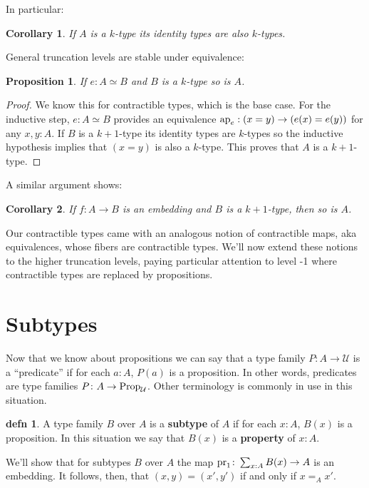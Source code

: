 \documentclass{amsart}
\theoremstyle{theorem}
\newtheorem*{cor}{Corollary}
\newtheorem*{prop}{Proposition}
\theoremstyle{definition}
\newtheorem*{defn}{defn}
\theoremstyle{remark}
\newcommand{\0}{\mathbbe{0}}
\newcommand{\1}{\mathbbe{1}}
\newcommand{\2}{\mathbbe{2}}
\newcommand{\3}{\mathbbe{3}}
\newcommand{\4}{\mathbbe{4}}
\newcommand{\term}[1]{{\textup{#1}}}
\newcommand{\type}[1]{{\textup{#1}}}
\newcommand{\pr}{\term{pr}}
\newcommand{\ap}{\term{ap}}
\newcommand{\UU}{{\mathcal{U}}}
\newcommand{\Prop}{\type{Prop}_{\UU}}
\begin{document}
In particular:

\begin{cor} If $A$ is a $k$-type its identity types are also $k$-types.
\end{cor}

General truncation levels are stable under equivalence:

\begin{prop} If $e : A \simeq B$ and $B$ is a $k$-type so is $A$.
\end{prop}
\begin{proof}
We know this for contractible types, which is the base case. For the inductive step, $e: A \simeq B$ provides an equivalence $\ap_e :(x=y) \to (e(x)=e(y))$ for any $x,y:A$. If $B$ is a $k+1$-type its identity types are $k$-types so the inductive hypothesis implies that $(x=y)$ is also a $k$-type. This proves that $A$ is a $k+1$-type.
\end{proof}

A similar argument shows:

\begin{cor} If $f \colon A \to B$ is an embedding and $B$ is a $k+1$-type, then so is $A$.
\end{cor}

Our contractible types came with an analogous notion of contractible maps, aka equivalences, whose fibers are contractible types. We'll now extend these notions to the higher truncation levels, paying particular attention to level -1 where contractible types are replaced by propositions.


\section*{Subtypes}

Now that we know about propositions we can say that a type family $P \colon A \to \UU$ is a ``predicate'' if for each $a :A$, $P(a)$ is a proposition. In other words, predicates are type families $P \colon A \to \Prop$. Other terminology is commonly in use in this situation.

\begin{defn} A type family $B$ over $A$ is a \textbf{subtype} of $A$ if for each $x:A$, $B(x)$ is a proposition. In this situation we say that $B(x)$ is a \textbf{property} of $x:A$.
\end{defn}

We'll show that for subtypes $B$ over $A$ the map $\pr_1 \colon \sum_{x:A} B(x) \to A$ is an embedding. It follows, then, that $(x,y) = (x',y')$ if and only if $x=_Ax'$.
\end{document}
